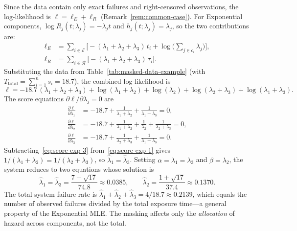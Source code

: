 \documentclass[11pt]{article}
\theoremstyle{definition}
\theoremstyle{plain}
\begin{document}
Since the data contain only exact failures and right-censored
observations, the log-likelihood is
$\ell = \ell_E + \ell_R$ (Remark~\ref{rem:common-case}).
For Exponential components, $\log R_j(t; \lambda_j) = -\lambda_j t$
and $h_j(t; \lambda_j) = \lambda_j$, so the two contributions are:
\begin{align}
\label{eq:ll-exp-E}
    \ell_E
    &= \sum_{i \in \mathcal{E}} \biggl[
        -(\lambda_1 + \lambda_2 + \lambda_3) \, t_i
        + \log\biggl(\sum_{j \in c_i} \lambda_j\biggr)
    \biggr], \\[4pt]
\label{eq:ll-exp-R}
    \ell_R
    &= \sum_{i \in \mathcal{R}}
        \bigl[-(\lambda_1 + \lambda_2 + \lambda_3) \, \tau_i\bigr].
\end{align}
Substituting the data from Table~\ref{tab:masked-data-example}
(with $T_{\mathrm{total}} = \sum_{i=1}^n s_i = 18.7$),
the combined log-likelihood is
\begin{equation}
\label{eq:ll-exponential-explicit}
    \ell = -18.7 \, (\lambda_1 + \lambda_2 + \lambda_3)
    + \log(\lambda_1 + \lambda_2)
    + \log(\lambda_2)
    + \log(\lambda_2 + \lambda_3)
    + \log(\lambda_1 + \lambda_3).
\end{equation}
The score equations $\partial \ell / \partial \lambda_j = 0$ are
\begin{align}
    \frac{\partial \ell}{\partial \lambda_1}
    &= -18.7
        + \frac{1}{\lambda_1 + \lambda_2}
        + \frac{1}{\lambda_1 + \lambda_3} = 0,
        \label{eq:score-exp-1} \\
    \frac{\partial \ell}{\partial \lambda_2}
    &= -18.7
        + \frac{1}{\lambda_1 + \lambda_2}
        + \frac{1}{\lambda_2}
        + \frac{1}{\lambda_2 + \lambda_3} = 0,
        \label{eq:score-exp-2} \\
    \frac{\partial \ell}{\partial \lambda_3}
    &= -18.7
        + \frac{1}{\lambda_2 + \lambda_3}
        + \frac{1}{\lambda_1 + \lambda_3} = 0.
        \label{eq:score-exp-3}
\end{align}
Subtracting~\eqref{eq:score-exp-3} from~\eqref{eq:score-exp-1} gives
$1/(\lambda_1 + \lambda_2) = 1/(\lambda_2 + \lambda_3)$, so
$\hat\lambda_1 = \hat\lambda_3$.
Setting $\alpha = \lambda_1 = \lambda_3$ and $\beta = \lambda_2$,
the system reduces to two equations whose solution is
\begin{equation}
    \hat\lambda_1 = \hat\lambda_3
    = \frac{7 - \sqrt{17}}{74.8} \approx 0.0385, \qquad
    \hat\lambda_2
    = \frac{1 + \sqrt{17}}{37.4} \approx 0.1370.
\end{equation}
The total system failure rate is
$\hat\lambda_1 + \hat\lambda_2 + \hat\lambda_3 = 4/18.7 \approx 0.2139$,
which equals the number of observed failures divided by the total
exposure time---a general property of the Exponential MLE.
The masking affects only the \emph{allocation} of hazard across
components, not the total.
\end{document}
